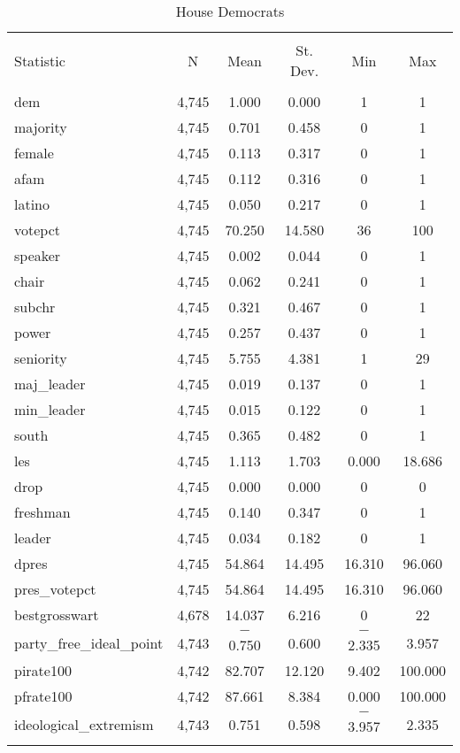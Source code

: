 \documentclass[12pt]{article}
\begin{document}
\begin{table}[ht] \centering 
	\caption{House Democrats} 
	\label{} 
	\begin{tabular}{@{\extracolsep{5pt}}lccccc} 
		\\[-1.8ex]\hline 
		\hline \\[-1.8ex] 
		Statistic & \multicolumn{1}{c}{N} & \multicolumn{1}{c}{Mean} & \multicolumn{1}{c}{St. Dev.} & \multicolumn{1}{c}{Min} & \multicolumn{1}{c}{Max} \\ 
		\hline \\[-1.8ex] 
		dem & 4,745 & 1.000 & 0.000 & 1 & 1 \\ 
		majority & 4,745 & 0.701 & 0.458 & 0 & 1 \\ 
		female & 4,745 & 0.113 & 0.317 & 0 & 1 \\ 
		afam & 4,745 & 0.112 & 0.316 & 0 & 1 \\ 
		latino & 4,745 & 0.050 & 0.217 & 0 & 1 \\ 
		votepct & 4,745 & 70.250 & 14.580 & 36 & 100 \\ 
		speaker & 4,745 & 0.002 & 0.044 & 0 & 1 \\ 
		chair & 4,745 & 0.062 & 0.241 & 0 & 1 \\ 
		subchr & 4,745 & 0.321 & 0.467 & 0 & 1 \\ 
		power & 4,745 & 0.257 & 0.437 & 0 & 1 \\ 
		seniority & 4,745 & 5.755 & 4.381 & 1 & 29 \\ 
		maj\_leader & 4,745 & 0.019 & 0.137 & 0 & 1 \\ 
		min\_leader & 4,745 & 0.015 & 0.122 & 0 & 1 \\ 
		south & 4,745 & 0.365 & 0.482 & 0 & 1 \\ 
		les & 4,745 & 1.113 & 1.703 & 0.000 & 18.686 \\ 
		drop & 4,745 & 0.000 & 0.000 & 0 & 0 \\ 
		freshman & 4,745 & 0.140 & 0.347 & 0 & 1 \\ 
		leader & 4,745 & 0.034 & 0.182 & 0 & 1 \\ 
		dpres & 4,745 & 54.864 & 14.495 & 16.310 & 96.060 \\ 
		pres\_votepct & 4,745 & 54.864 & 14.495 & 16.310 & 96.060 \\ 
		bestgrosswart & 4,678 & 14.037 & 6.216 & 0 & 22 \\ 
		party\_free\_ideal\_point & 4,743 & $-$0.750 & 0.600 & $-$2.335 & 3.957 \\ 
		pirate100 & 4,742 & 82.707 & 12.120 & 9.402 & 100.000 \\ 
		pfrate100 & 4,742 & 87.661 & 8.384 & 0.000 & 100.000 \\ 
		ideological\_extremism & 4,743 & 0.751 & 0.598 & $-$3.957 & 2.335 \\ 
		\hline
		
		\hline
		\hline \\[-1.8ex] 
	\end{tabular} 
\end{table} 
\end{document}
